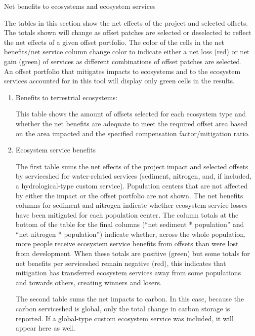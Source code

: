 \documentclass[11pt,letterpaper]{report}
\newenvironment{myenumerate}{%
	\edef\backupindent{\the\parindent}
	\enumerate
	\setlength{\parindent}{\backupindent}
		\setlist[enumerate,1]{label=(\arabic*)}
		\setlist[enumerate,2]{label=(\arabic*)}
}{\endenumerate}
\begin{document}
\begin{myenumerate}
		{\bfseries \item  Net benefits to ecosystems and ecosystem services}
		
			The tables in this section show the net effects of the project and selected offsets. The totals shown will change as offset patches are selected or deselected to reflect the net effects of a given offset portfolio. The color of the cells in the net benefits/net service column change color to indicate either a net loss (red) or net gain (green) of services as different combinations of offset patches are selected. An offset portfolio that mitigates impacts to ecosystems and to the ecosystem services accounted for in this tool will display only green cells in the results. 
			
			\begin{enumerate}[label=\alph*]
				\item Benefits to terrestrial ecosystems:
				
					This table shows the amount of offsets selected for each ecosystem type and whether the net benefits are adequate to meet the required offset area based on the area impacted and the specified compensation factor/mitigation ratio.
					
				\item Ecosystem service benefits
				
					The first table sums the net effects of the project impact and selected offsets by serviceshed for water-related services (sediment, nitrogen, and, if included, a hydrological-type custom service). Population centers that are not affected by either the impact or the offset portfolio are not shown. The net benefits columns for sediment and nitrogen indicate whether ecosystem service losses have been mitigated for each population center. The column totals at the bottom of the table for the final columns (``net sediment * population'' and ``net nitrogen * population'') indicate whether, across the whole population, more people receive ecosystem service benefits from offsets than were lost from development. When these totals are positive (green) but some totals for net benefits per serviceshed remain negative (red), this indicates that mitigation has transferred ecosystem services away from some populations and towards others, creating winners and losers.
					
					The second table sums the net impacts to carbon. In this case, because the carbon serviceshed is global, only the total change in carbon storage is reported. If a global-type custom ecosystem service was included, it will appear here as well.
			\end{enumerate}
	\end{myenumerate}
\end{document}
